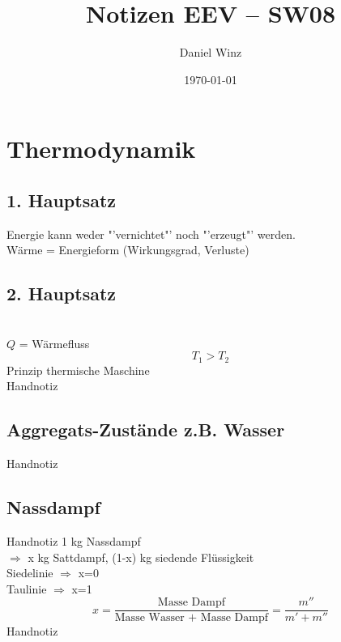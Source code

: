 \documentclass[a4,paper,fleqn]{article}
\title{Notizen EEV -- SW08}
\date{\today}
\author{Daniel Winz}
\begin{document}
\maketitle
\clearpage

\section{Thermodynamik}

\subsection{1. Hauptsatz}
Energie kann weder "'vernichtet"' noch "'erzeugt"' werden. \\
Wärme = Energieform (Wirkungsgrad, Verluste)

\subsection{2. Hauptsatz}
\\
$Q$ = Wärmefluss
\[ T_1 > T_2 \]
Prinzip thermische Maschine
\\Handnotiz

\subsection{Aggregats-Zustände z.B. Wasser}
Handnotiz

\subsection{Nassdampf}
Handnotiz
1 kg Nassdampf\\
$\Rightarrow$ x kg Sattdampf, (1-x) kg siedende Flüssigkeit\\
Siedelinie $\Rightarrow$ x=0\\
Taulinie $\Rightarrow$ x=1
\[ x = \frac{\text{Masse Dampf}}{\text{Masse Wasser + Masse Dampf}} = \frac{m''}{m' + m''} \]
Handnotiz
\end{document}
